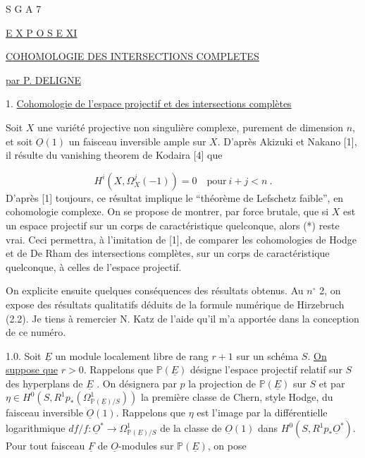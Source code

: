 


S G A 7


\underline{E X P O S E  XI}


\underline{\underline{COHOMOLOGIE DES INTERSECTIONS COMPLETES}}


\underline{par P. DELIGNE}


1. \underline{Cohomologie de l'espace projectif et des intersections compl\`etes}

Soit $X$ une vari\'et\'e projective non singuli\`ere complexe, purement de dimension $n$, et soit $\underline{O}(1)$ un faisceau inversible ample sur $X$. D'apr\`es Akizuki et Nakano [1], il r\'esulte du vanishing theorem de Kodaira [4] que

\begin{equation}\tag{*}
H^i(X,\Omega^j_X (-1)) = 0 \quad \mathrm{pour}\ i+j < n \ .
\end{equation}
D'apr\`es [1] toujours, ce r\'esultat implique le ``th\'eor\`eme de Lefschetz faible'', en cohomologie complexe. On se propose de montrer, par force brutale, que si $X$ est un espace projectif sur un corps de caract\'eristique quelconque, alors (*) reste vrai. Ceci permettra, \`a l'imitation de [1], de comparer les cohomologies de Hodge et de De Rham des intersections compl\`etes, sur un corps de caract\'eristique quelconque, \`a celles de l'espace projectif.

On explicite ensuite quelques cons\'equences des r\'esultats obtenus. Au $n^{\circ}$ 2, on expose des r\'esultats qualitatifs d\'eduits de la formule num\'erique de Hirzebruch (2.2). Je tiens \`a remercier N. Katz de l'aide qu'il m'a apport\'ee dans la conception de ce num\'ero.

1.0. Soit $\underline{E}$ un module localement libre de rang $r+1$ sur un sch\'ema $S$. \underline{On suppose que} $r > 0$. Rappelons que $\mathbb{P}(\underline{E})$ d\'esigne l'espace projectif relatif sur $S$ des hyperplans de $\underline{E}$ . On d\'esignera par $p$ la projection de $\mathbb{P}(\underline{E})$ sur $S$ et par $\eta \in H^0(S,R^1 p_*(\Omega^1_{\mathbb{P}(\underline{E})/S}))$ la premi\`ere classe de Chern, style Hodge, du faisceau
inversible $\underline{O}(1)$. Rappelons que $\eta$ est l'image par la diff\'erentielle logarithmique $df/f : \underline{O}^* \longrightarrow \Omega^1_{\mathbb{P}(\underline{E})/S}$ de la classe de $\underline{O}(1)$ dans $H^0(S,R^1 p_* \underline{O}^*)$. Pour tout faisceau $\underline{F}$ de $\underline{O}$-modules sur $\mathbb{P}(\underline{E})$, on pose

